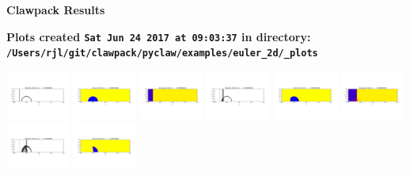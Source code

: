 \documentclass[11pt]{article}
\begin{document}
        \begin{center}{\Large\bf Clawpack Results}\vskip 5pt
        
        \bf Plots created {\tt Sat Jun 24 2017 at 09:03:37} in directory: \vskip 5pt
        \verb+/Users/rjl/git/clawpack/pyclaw/examples/euler_2d/_plots+
        \end{center}
        \vskip 5pt
        \includegraphics[width=0.15833333333333333\textwidth]{frame0000fig0.png}
\includegraphics[width=0.15833333333333333\textwidth]{frame0000fig1.png}
\includegraphics[width=0.15833333333333333\textwidth]{frame0000fig2.png}
\includegraphics[width=0.15833333333333333\textwidth]{frame0001fig0.png}
\includegraphics[width=0.15833333333333333\textwidth]{frame0001fig1.png}
\includegraphics[width=0.15833333333333333\textwidth]{frame0001fig2.png}
\vskip 10pt 
\includegraphics[width=0.15833333333333333\textwidth]{frame0002fig0.png}
\includegraphics[width=0.15833333333333333\textwidth]{frame0002fig1.png}
\end{document}
